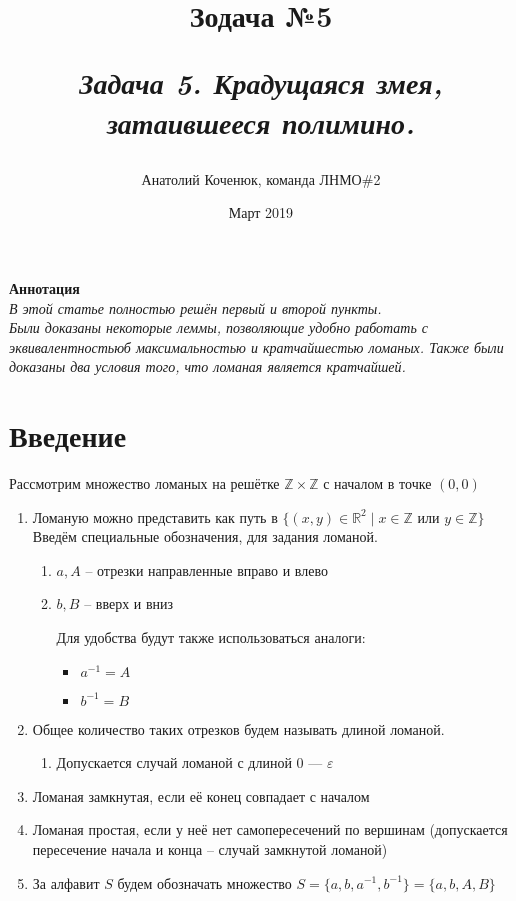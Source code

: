 \documentclass[12pt,a4paper, flushleft]{article}
\author{Анатолий Коченюк, команда ЛНМО\#2}
\date{Март 2019}
\title{Зодача \textsuperscript{\textregistered} №5}
\title{
	\vspace{4cm}	
	\horline{380}	
	\begin{center}
		\begin{Huge}
			\textbf{\emph{Задача 5. Крадущаяся змея, затаившееся полимино.}}
		\end{Huge}
	\end{center}	
	\vspace{-1.3cm}	
	\horline{400}
}
\begin{document}
\maketitle
\vspace{4cm}
	
	\begin{myquote}
	\begin{center}
		\textbf{Аннотация}\\
		\textit{
			В этой статье полностью решён первый и второй пункты.\\
			Были доказаны некоторые леммы, позволяющие удобно работать с эквивалентностьюб максимальностью и кратчайшестью ломаных.
			Также были доказаны два условия того, что ломаная является кратчайшей.
		}
	\end{center}
	\end{myquote}	
	
	\pagebreak

	\tableofcontents	
	
	\pagebreak

\section*{Введение}

Рассмотрим множество ломаных на решётке $\mathds{Z}\times \mathds{Z}$ с началом в точке $(0, 0)$

\begin{enumerate}
	\item Ломаную можно представить как путь в $\{(x, y)\in\mathds{R}^2\mid x\in \mathds{Z} \text{ или } y\in\mathds{Z}\}$
	Введём специальные обозначения, для задания ломаной.
	\begin{enumerate}
		\item[] $a, A$ -- отрезки направленные вправо и влево
		\item[] $b, B$ -- вверх и вниз
		
		Для удобства будут также использоваться аналоги:
		\begin{itemize}
			\item $a^{-1} = A$
			\item $b^{-1} = B$
		\end{itemize}
	\end{enumerate}
	\item Общее количество таких отрезков будем называть длиной ломаной.
	\begin{enumerate}
		\item []Допускается случай ломаной с длиной 0 --- $\varepsilon$
	\end{enumerate}
	\item Ломаная замкнутая, если её конец совпадает с началом
	\item Ломаная простая, если у неё нет самопересечений по вершинам (допускается пересечение начала и конца -- случай замкнутой ломаной)
	\item За алфавит $S$ будем обозначать множество $S = \{a, b, a^{-1}, b^{-1}\} = \{a, b, A, B\}$ 	
\end{enumerate}
\end{document}
